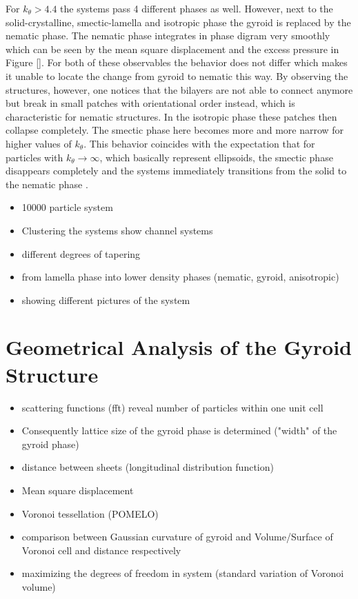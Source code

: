 \documentclass[epj,onecolumn]{webofc}
\begin{document}
For $k_{\theta}>4.4$ the systems pass 4 different phases as well. However, next to the solid-crystalline, smectic-lamella and isotropic phase the gyroid is replaced by the nematic phase. The nematic phase integrates in phase digram very smoothly which can be seen by the mean square displacement and the excess pressure in Figure \ref{}. For both of these observables the behavior does not differ which makes it unable to locate the change from gyroid to nematic this way. By observing the structures, however, one notices that the bilayers are not able to connect anymore but  break in small patches with orientational order instead, which is characteristic for nematic structures. In the isotropic phase these patches then collapse completely. The smectic phase here becomes more and more narrow for higher values of $k_{\theta}$. This behavior coincides with the expectation that for particles with $k_{\theta}\rightarrow\infty$, which basically represent ellipsoids, the smectic phase disappears completely and the systems immediately transitions from the solid to the nematic phase \cite{}. 

\begin{itemize}
    \item 10000 particle system
    \item Clustering the systems show channel systems
    \item different degrees of tapering
    \item from lamella phase into lower density phases (nematic, gyroid, anisotropic)
    \item showing different pictures of the system
\end{itemize}

\section{Geometrical Analysis of the Gyroid Structure}
\label{sec:GeometricalAnalysis}

\begin{itemize}
    \item scattering functions (fft) reveal number of particles within one unit cell
     \item Consequently lattice size of the gyroid phase is determined ("width" of the gyroid phase)
    \item distance between sheets (longitudinal distribution function)
    \item Mean square displacement
    \item Voronoi tessellation (POMELO)
    \item comparison between Gaussian curvature of gyroid and Volume/Surface of Voronoi cell and distance respectively
    \item maximizing the degrees of freedom in system (standard variation of Voronoi volume)
\end{itemize}
\end{document}
